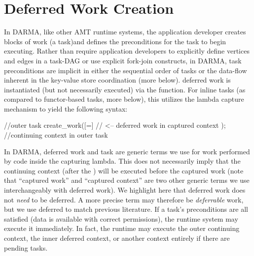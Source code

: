 \section{Deferred Work Creation}
\label{sec:deferred}
In \gls{DARMA}, like other \gls{AMT} \glspl{runtime system}, 
the application developer creates blocks of work (a \gls{task})and defines the
\glspl{precondition} for the \gls{task} to begin executing.
Rather than require application developers to explicitly define vertices and
edges in a \gls{task-DAG} or use explicit \gls{fork-join} constructs,
in \gls{DARMA}, \gls{task} \glspl{precondition} are implicit in either the sequential 
order of \glspl{task} or the data-flow inherent in the \gls{key-value store}
coordination (more below).
\Gls{deferred work} is instantiated (but not necessarily executed) via the  function. 
For inline \glspl{task} (as compared to functor-based \glspl{task}, more
below), this utilizes the \CC{} \gls{lambda} \gls{capture} mechanism to yield the following syntax:

\begin{CppCode}
//outer task
create_work([=]{
  // <-- deferred work in captured context
});
//continuing context in outer task
\end{CppCode}

In \gls{DARMA}, \gls{deferred work} and \gls{task} are generic terms we use for work
performed by code inside the capturing \gls{lambda}.
This does not necessarily imply that the \gls{continuing context} (after the ) will be
executed before the \gls{captured work} (note that ``\gls{captured work}'' and
``\gls{captured context}'' are two other generic terms we use interchangeably
with \gls{deferred work}).  
We highlight here that \gls{deferred work} does not \emph{need} to be deferred.
A more precise term may therefore be \emph{deferrable} work, but we use deferred to match previous literature.
If a \gls{task}'s \glspl{precondition} are all satisfied (data is available with correct permissions),
the \gls{runtime system} may execute it immediately.  
In fact, the runtime may execute the outer continuing context, the inner deferred context, or another context entirely if there are pending tasks.


